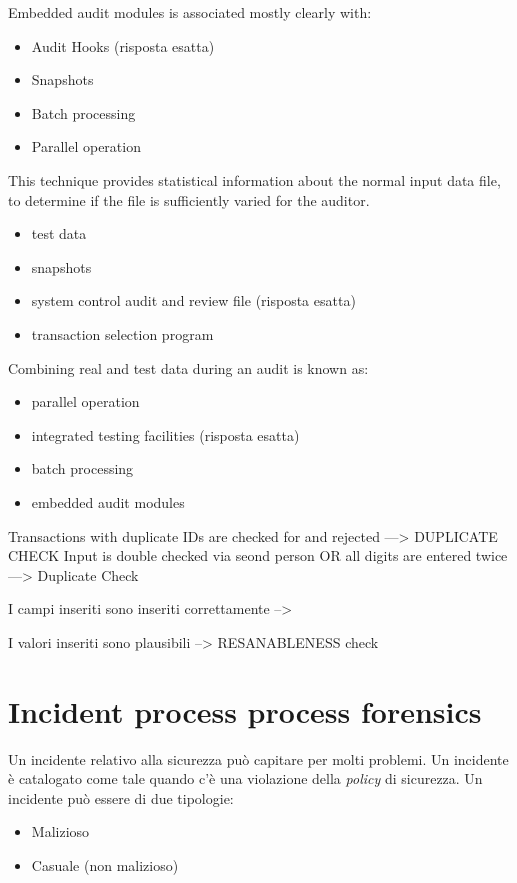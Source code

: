 
Embedded audit modules is associated mostly clearly with:
\begin{itemize}
\item Audit Hooks (risposta esatta)
\item Snapshots
\item Batch processing
\item Parallel operation
\end{itemize}

This technique provides statistical information about the normal input data 
file, to determine if the file is sufficiently varied for the auditor.

\begin{itemize}
\item test data
\item snapshots
\item system control audit and review file (risposta esatta)
\item transaction selection program
\end{itemize}


Combining real and test data during an audit is known as:
\begin{itemize}
\item parallel operation
\item integrated testing facilities (risposta esatta)
\item batch processing
\item embedded audit modules
\end{itemize}



Transactions with duplicate IDs are checked for and rejected ---> DUPLICATE 
CHECK
Input is double checked via seond person OR all digits are entered twice ---> 
Duplicate Check

I campi inseriti sono inseriti correttamente --> 


I valori inseriti sono plausibili --> RESANABLENESS check


\part{Incident process process forensics}

Un incidente relativo alla sicurezza può capitare per molti problemi. Un 
incidente è catalogato come tale quando c'è una violazione della \textit{policy} 
di sicurezza. Un incidente può essere di due tipologie:
\begin{itemize}
\item Malizioso
\item Casuale (non malizioso)
\end{itemize}


